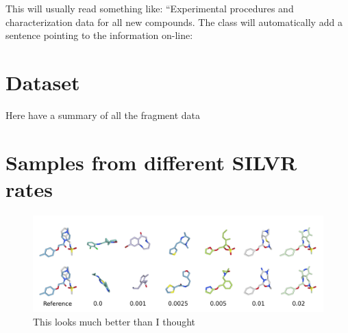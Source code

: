 \begin{suppinfo}

This will usually read something like: ``Experimental procedures and
characterization data for all new compounds. The class will
automatically add a sentence pointing to the information on-line:
\section{Dataset}
Here have a summary of all the fragment data

\section{Samples from different SILVR rates}
\begin{figure}
    \centering
    \includegraphics[width=\textwidth]{Figures/molecules_silvr_rates_horizontal.png}
    \caption{This looks much better than I thought}
    \label{fig:fig_2}
\end{figure}


\end{suppinfo}